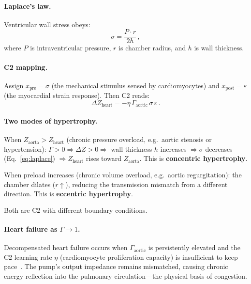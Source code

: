 \documentclass[aps,pre,twocolumn,superscriptaddress,floatfix]{revtex4-2}
\begin{document}
\paragraph{Laplace's law.}
Ventricular wall stress obeys:
\begin{equation}
  \sigma = \frac{P \cdot r}{2 h}\,,
  \label{eq:laplace}
\end{equation}
where $P$ is intraventricular pressure, $r$ is
chamber radius, and $h$ is wall thickness.

\paragraph{C2 mapping.}
Assign $x_{\text{pre}} = \sigma$ (the mechanical
stimulus sensed by cardiomyocytes) and
$x_{\text{post}} = \varepsilon$ (the myocardial strain
response).  Then C2 reads:
\begin{equation}
  \Delta Z_{\text{heart}} =
  -\eta\,\Gamma_{\text{aortic}}\,\sigma\,\varepsilon\,.
  \label{eq:c2-cardiac}
\end{equation}

\paragraph{Two modes of hypertrophy.}
When $Z_{\text{aorta}} > Z_{\text{heart}}$
(chronic pressure overload, e.g.\ aortic stenosis
or hypertension): $\Gamma > 0 \Rightarrow \Delta Z > 0
\Rightarrow$ wall thickness $h$ increases
$\Rightarrow \sigma$ decreases (Eq.~\ref{eq:laplace})
$\Rightarrow Z_{\text{heart}}$ rises toward
$Z_{\text{aorta}}$.
This is \textbf{concentric hypertrophy}.

When preload increases (chronic volume overload,
e.g.\ aortic regurgitation): the chamber dilates
($r \uparrow$), reducing the transmission
mismatch from a different direction.
This is \textbf{eccentric hypertrophy}.

Both are C2 with different boundary conditions.

\paragraph{Heart failure as $\Gamma \to 1$.}
Decompensated heart failure occurs when
$\Gamma_{\text{aortic}}$ is persistently elevated
and the C2 learning rate $\eta$ (cardiomyocyte
proliferation capacity) is insufficient to keep
pace~\cite{Grossman1975}.
The pump's output impedance remains mismatched,
causing chronic energy reflection into the
pulmonary circulation---the physical basis of
congestion.
\end{document}
